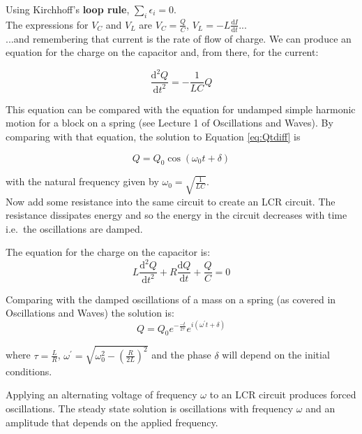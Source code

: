 \documentclass[
]{book}
\numberwithin{equation}{section}
\begin{document}
Using Kirchhoff's \textbf{loop rule}, \(\sum_i \epsilon_i = 0\).\\
The expressions for \(V_C\) and \(V_L\) are \(V_C = \frac{Q}{C}\),
\(V_L = -L \frac{\mathrm{d} I}{\mathrm{d} t}\)...\\
...and remembering that current is the rate of flow of charge. We can
produce an equation for the charge on the capacitor and, from there, for
the current:

\begin{equation}
\label{eq:QtDiff}
\frac{\mathrm{d}^2 Q}{\mathrm{d} t^2} = - \frac{1}{LC} Q
\end{equation}

This equation can be compared with the equation for undamped simple
harmonic motion for a block on a spring (see Lecture 1 of Oscillations
and Waves). By comparing with that equation, the solution to Equation \eqref{eq:Qtdiff} is

\begin{equation}
\label{eq:Qsolution}
Q = Q_0 \cos⁡(\omega_0 t + \delta)
\end{equation}

with the natural frequency given by \(\omega_0 = \sqrt{ \frac{1}{LC} }\).\\
Now add some resistance into the same circuit to create an LCR circuit.
The resistance dissipates energy and so the energy in the circuit
decreases with time i.e.~the oscillations are damped.

The equation for the charge on the capacitor is:
\begin{equation}
\label{eq:diffEqQ}
L \frac{ \mathrm{d}^2 Q}{\mathrm{d} t^2} + R \frac{\mathrm{d} Q}{\mathrm{d} t} + \frac{Q}{C} = 0
\end{equation}

Comparing with the damped oscillations of a mass on a spring (as covered
in Oscillations and Waves) the solution is:
\begin{equation}
\label{eq:Qsol}
Q = Q_0 e^{ - \frac{-t}{2\tau} } e^{i(\omega^{'} t + \delta)}
\end{equation}

where \(\tau = \frac{L}{R}\),
\(\omega^{'} = \sqrt{ \omega_0^2 - \left( \frac{R}{2 L} \right)^2}\) and
the phase \(\delta\) will depend on the initial conditions.

Applying an alternating voltage of frequency \(\omega\) to an LCR circuit
produces forced oscillations. The steady state solution is oscillations
with frequency \(\omega\) and an amplitude that depends on the applied
frequency.
\end{document}
